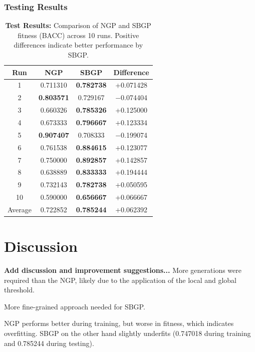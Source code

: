 \documentclass{article}
\begin{document}
\subsubsection{Testing Results}
\begin{table}[H]
\centering
\label{tab:bacc_comparison}
\begin{tabular}{cccc}
\toprule
\textbf{Run} & \textbf{NGP} & \textbf{SBGP} & \textbf{Difference} \\
\midrule
1  & 0.711310 & \textbf{0.782738} & +0.071428 \\
2  & \textbf{0.803571} & 0.729167 & $-$0.074404 \\
3  & 0.660326 & \textbf{0.785326} & +0.125000 \\
4  & 0.673333 & \textbf{0.796667} & +0.123334 \\
5  & \textbf{0.907407} & 0.708333 & $-$0.199074 \\
6  & 0.761538 & \textbf{0.884615} & +0.123077 \\
7  & 0.750000 & \textbf{0.892857} & +0.142857 \\
8  & 0.638889 & \textbf{0.833333} & +0.194444 \\
9  & 0.732143 & \textbf{0.782738} & +0.050595 \\
10 & 0.590000 & \textbf{0.656667} & +0.066667 \\
\midrule
Average & 0.722852 & \textbf{0.785244} & +0.062392 \\
\bottomrule
\end{tabular}
\caption{\textbf{Test Results:} Comparison of NGP and SBGP fitness (BACC) across 10 runs. Positive differences indicate better performance by SBGP.}
\end{table}

\section{Discussion}
\textbf{Add discussion and improvement suggestions...}
More generations were required than the NGP, likely due to the application of the local and global threshold.

More fine-grained approach needed for SBGP.

NGP performs better during training, but worse in fitness, which indicates overfitting. SBGP on the other hand slightly underfits (0.747018 during training and 0.785244 during testing).



\end{document}
